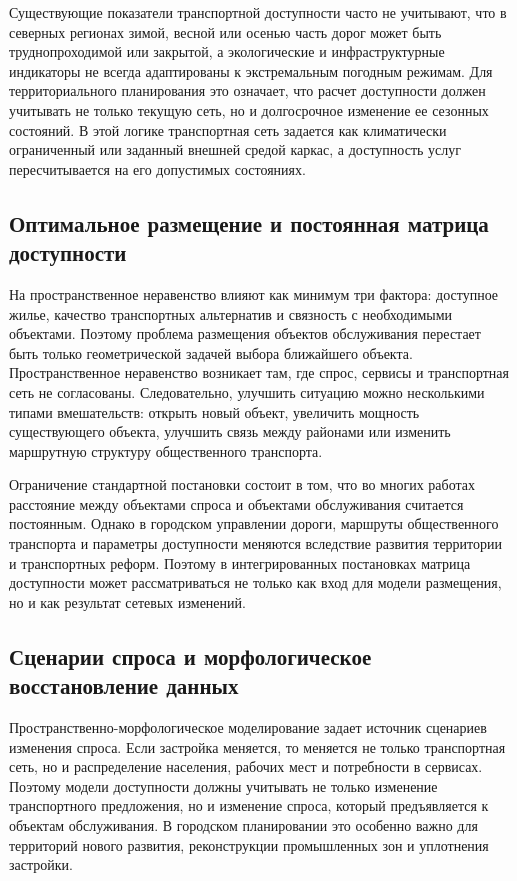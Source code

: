 \documentclass[14pt,a4paper]{extarticle}
\begin{document}
Существующие показатели транспортной доступности часто не учитывают, что в северных регионах зимой, весной или осенью часть дорог может быть труднопроходимой или закрытой, а экологические и инфраструктурные индикаторы не всегда адаптированы к экстремальным погодным режимам. Для территориального планирования это означает, что расчет доступности должен учитывать не только текущую сеть, но и долгосрочное изменение ее сезонных состояний. В этой логике транспортная сеть задается как климатически ограниченный или заданный внешней средой каркас, а доступность услуг пересчитывается на его допустимых состояниях.

\subsection*{Оптимальное размещение и постоянная матрица доступности}

На пространственное неравенство влияют как минимум три фактора: доступное жилье, качество транспортных альтернатив и связность с необходимыми объектами. Поэтому проблема размещения объектов обслуживания перестает быть только геометрической задачей выбора ближайшего объекта. Пространственное неравенство возникает там, где спрос, сервисы и транспортная сеть не согласованы. Следовательно, улучшить ситуацию можно несколькими типами вмешательств: открыть новый объект, увеличить мощность существующего объекта, улучшить связь между районами или изменить маршрутную структуру общественного транспорта.

Ограничение стандартной постановки состоит в том, что во многих работах расстояние между объектами спроса и объектами обслуживания считается постоянным. Однако в городском управлении дороги, маршруты общественного транспорта и параметры доступности меняются вследствие развития территории и транспортных реформ. Поэтому в интегрированных постановках матрица доступности может рассматриваться не только как вход для модели размещения, но и как результат сетевых изменений.

\subsection*{Сценарии спроса и морфологическое восстановление данных}

Пространственно-морфологическое моделирование задает источник сценариев изменения спроса. Если застройка меняется, то меняется не только транспортная сеть, но и распределение населения, рабочих мест и потребности в сервисах. Поэтому модели доступности должны учитывать не только изменение транспортного предложения, но и изменение спроса, который предъявляется к объектам обслуживания. В городском планировании это особенно важно для территорий нового развития, реконструкции промышленных зон и уплотнения застройки.
\end{document}
